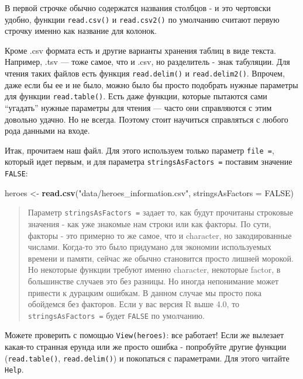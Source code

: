 \documentclass[
]{book}
\newenvironment{Shaded}{\begin{snugshade}}{\end{snugshade}}
\newcommand{\DataTypeTok}[1]{\textcolor[rgb]{0.13,0.29,0.53}{#1}}
\newcommand{\KeywordTok}[1]{\textcolor[rgb]{0.13,0.29,0.53}{\textbf{#1}}}
\newcommand{\NormalTok}[1]{#1}
\newcommand{\OtherTok}[1]{\textcolor[rgb]{0.56,0.35,0.01}{#1}}
\newcommand{\StringTok}[1]{\textcolor[rgb]{0.31,0.60,0.02}{#1}}
\begin{document}
В первой строчке обычно содержатся названия столбцов - и это чертовски удобно, функции \texttt{read.csv()} и \texttt{read.csv2()} по умолчанию считают первую строчку именно как название для колонок.

Кроме .csv формата есть и другие варианты хранения таблиц в виде текста. Например, .tsv
--- тоже самое, что и .csv, но разделитель - знак табуляции. Для чтения таких файлов есть функция \texttt{read.delim()} и \texttt{read.delim2()}. Впрочем, даже если бы ее и не было, можно было бы просто подобрать нужные параметры для функции \texttt{read.table()}. Есть даже функции, которые пытаются сами ``угадать'' нужные параметры для чтения --- часто они справляются с этим довольно удачно. Но не всегда. Поэтому стоит научиться справляться с любого рода данными на входе.

Итак, прочитаем наш файл. Для этого используем только параметр \texttt{file\ =}, который идет первым, и для параметра \texttt{stringsAsFactors\ =} поставим значение \texttt{FALSE}:

\begin{Shaded}
\begin{Highlighting}[]
\NormalTok{heroes <-}\StringTok{ }\KeywordTok{read.csv}\NormalTok{(}\StringTok{"data/heroes_information.csv"}\NormalTok{, }\DataTypeTok{stringsAsFactors =} \OtherTok{FALSE}\NormalTok{)}
\end{Highlighting}
\end{Shaded}

\begin{quote}
Параметр \texttt{stringsAsFactors\ =} задает то, как будут прочитаны строковые значения - как уже знакомые нам строки или как факторы. По сути, факторы - это примерно то же самое, что и character, но закодированные числами. Когда-то это было придумано для экономии используемых времени и памяти, сейчас же обычно становится просто лишней морокой. Но некоторые функции требуют именно character, некоторые factor, в большинстве случаев это без разницы. Но иногда непонимание может привести к дурацким ошибкам. В данном случае мы просто пока обойдемся без факторов. Если у вас версия R выше 4.0, то \texttt{stringsAsFactors\ =} будет \texttt{FALSE} по умолчанию.
\end{quote}

Можете проверить с помощью \texttt{View(heroes)}: все работает! Если же вылезает какая-то странная ерунда или же просто ошибка - попробуйте другие функции (\texttt{read.table()}, \texttt{read.delim()}) и покопаться с параметрами. Для этого читайте \texttt{Help}.
\end{document}
